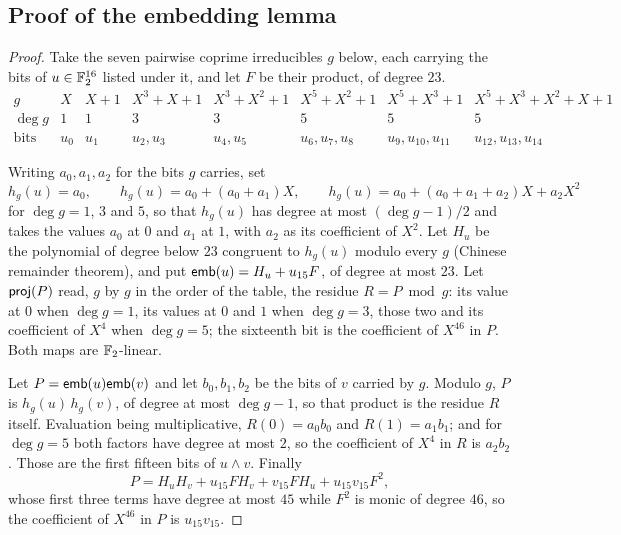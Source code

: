 \subsection{Proof of the embedding lemma}\label{keccak:rmfe-proof}

\begin{proof}
Take the seven pairwise coprime irreducibles $g$ below, each carrying the bits of $u \in \mathbb{F}_2^{16}$ listed under it, and let $F$ be their product, of degree $23$.
{\setlength{\arraycolsep}{3pt}
\[
\begin{array}{c|c|c|c|c|c|c|c}
g & X & X+1 & X^3+X+1 & X^3+X^2+1 & X^5+X^2+1 & X^5+X^3+1 & X^5+X^3+X^2+X+1\\\hline
\deg g & 1 & 1 & 3 & 3 & 5 & 5 & 5\\
\text{bits} & u_0 & u_1 & u_2,u_3 & u_4,u_5 & u_6,u_7,u_8 & u_9,u_{10},u_{11} & u_{12},u_{13},u_{14}
\end{array}
\]}

Writing $a_0,a_1,a_2$ for the bits $g$ carries, set
\[
  h_g(u)=a_0,\qquad h_g(u)=a_0+(a_0+a_1)X,\qquad h_g(u)=a_0+(a_0+a_1+a_2)X+a_2X^{2}
\]
for $\deg g=1$, $3$ and $5$, so that $h_g(u)$ has degree at most $(\deg g-1)/2$ and takes the values $a_0$ at $0$ and $a_1$ at $1$, with $a_2$ as its coefficient of $X^{2}$. Let $H_u$ be the polynomial of degree below $23$ congruent to $h_g(u)$ modulo every $g$ (Chinese remainder theorem), and put $\mathsf{emb}(u)=H_u+u_{15}F$, of degree at most $23$. Let $\mathsf{proj}(P)$ read, $g$ by $g$ in the order of the table, the residue $R=P\bmod g$: its value at $0$ when $\deg g=1$, its values at $0$ and $1$ when $\deg g=3$, those two and its coefficient of $X^{4}$ when $\deg g=5$; the sixteenth bit is the coefficient of $X^{46}$ in $P$. Both maps are $\mathbb{F}_2$-linear.

Let $P=\mathsf{emb}(u)\mathsf{emb}(v)$ and let $b_0,b_1,b_2$ be the bits of $v$ carried by $g$. Modulo $g$, $P$ is $h_g(u)\,h_g(v)$, of degree at most $\deg g-1$, so that product is the residue $R$ itself. Evaluation being multiplicative, $R(0)=a_0b_0$ and $R(1)=a_1b_1$; and for $\deg g=5$ both factors have degree at most $2$, so the coefficient of $X^{4}$ in $R$ is $a_2b_2$. Those are the first fifteen bits of $u\wedge v$. Finally
\[
  P=H_uH_v+u_{15}FH_v+v_{15}FH_u+u_{15}v_{15}F^{2},
\]
whose first three terms have degree at most $45$ while $F^{2}$ is monic of degree $46$, so the coefficient of $X^{46}$ in $P$ is $u_{15}v_{15}$.
\end{proof}
